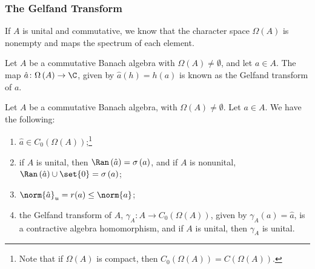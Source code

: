 \documentclass[10pt]{mypackage}
\begin{document}
\subsubsection{The Gelfand Transform}%
If $A$ is unital and commutative, we know that the character space $\Omega\left(A\right)$ is nonempty and maps the spectrum of each element.
\begin{definition}
  Let $A$ be a commutative Banach algebra with $\Omega\left(A\right)\neq \emptyset$, and let $a\in A$. The map $\hat{a}\colon \Omega\left(A\right)\rightarrow \C$, given by $\hat{a}\left(h\right) = h\left(a\right)$ is known as the Gelfand transform of $a$.
\end{definition}
\begin{proposition}
  Let $A$ be a commutative Banach algebra, with $\Omega\left(A\right) \neq \emptyset$. Let $a\in A$. We have the following:
  \begin{enumerate}[(1)]
    \item $\hat{a}\in C_0\left(\Omega\left(A\right)\right)$;\footnote{Note that if $\Omega\left(A\right)$ is compact, then $C_0\left(\Omega\left(A\right)\right) = C\left(\Omega\left(A\right)\right)$.}
    \item if $A$ is unital, then $\Ran\left(\hat{a}\right) = \sigma\left(a\right)$, and if $A$ is nonunital, $\Ran\left(\hat{a}\right) \cup \set{0} = \sigma\left(a\right)$;
    \item $\norm{\hat{a}}_u = r(a) \leq \norm{a}$;
    \item the Gelfand transform of $A$, $\gamma_A\colon A\rightarrow C_0\left(\Omega\left(A\right)\right)$, given by $\gamma_A\left(a\right)=  \hat{a}$, is a contractive algebra homomorphism, and if $A$ is unital, then $\gamma_A$ is unital.
  \end{enumerate}
\end{proposition}
\end{document}
